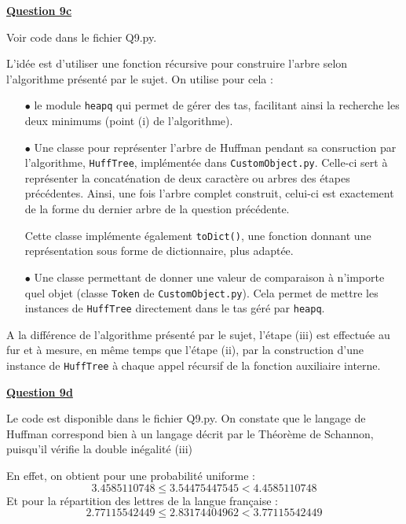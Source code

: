 \documentclass[a4paper,twoside,10pt]{article}
\newenvironment{Q}[1]{%
\vspace{1ex}
\underline{\textbf{Question #1\\}}
\newline
}{
\vspace{2ex}
}
\begin{document}
\begin{Q}{9c}
Voir code dans le fichier Q9.py.

L'idée est d'utiliser une fonction récursive pour construire l'arbre selon l'algorithme présenté par le sujet. On utilise pour cela :
\begin{itemize}

\item[$\bullet$]le module \texttt{heapq} qui permet de gérer des tas, facilitant ainsi la recherche les deux minimums (point (i) de l'algorithme).

\item[$\bullet$] Une classe pour représenter l'arbre de Huffman pendant sa consruction par l'algorithme, \texttt{HuffTree}, implémentée dans \texttt{CustomObject.py}. Celle-ci sert à représenter la concaténation de deux caractère ou arbres des étapes précédentes. Ainsi, une fois l'arbre complet construit, celui-ci est exactement de la forme du dernier arbre de la question précédente.

Cette classe implémente également \texttt{toDict()}, une fonction donnant une représentation sous forme de dictionnaire, plus adaptée.

\item[$\bullet$] Une classe permettant de donner une valeur de comparaison à n'importe quel objet (classe \texttt{Token} de \texttt{CustomObject.py}). Cela permet de mettre les instances de \texttt{HuffTree} directement dans le tas géré par \texttt{heapq}.
\end{itemize}

A la différence de l'algorithme présenté par le sujet, l'étape (iii) est effectuée au fur et à mesure, en même temps que l'étape (ii), par la construction d'une instance de \texttt{HuffTree} à chaque appel récursif de la fonction auxiliaire interne.

\end{Q}

\begin{Q}{9d}
Le code est disponible dans le fichier Q9.py.
On constate que le langage de Huffman correspond bien à un langage décrit par le Théorème de Schannon, puisqu'il vérifie
la double inégalité (iii)

En effet, on obtient pour une probabilité uniforme : 
\[ 3.4585110748 \leq 3.54475447545 < 4.4585110748 \]
Et pour la répartition des lettres de la langue française : 
\[ 2.77115542449 \leq 2.83174404962 < 3.77115542449 \]
\end{Q}
\end{document}
